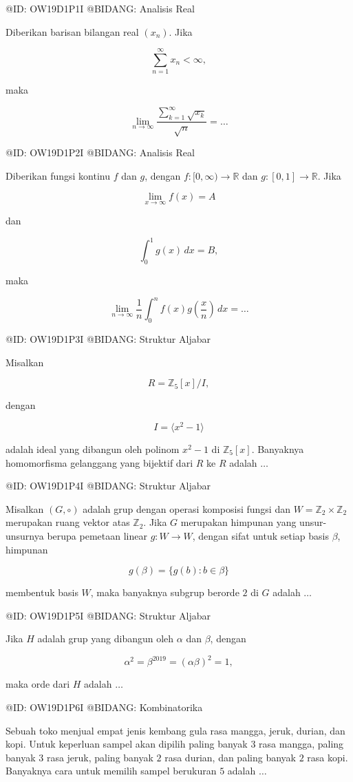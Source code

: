 @ID: OW19D1P1I
@BIDANG: Analisis Real

Diberikan barisan bilangan real $(x_n)$. Jika

$$
\sum_{n=1}^{\infty}x_n<\infty,
$$

maka

$$
\lim_{n\to\infty}\frac{\sum_{k=1}^{\infty}\sqrt{x_k}}{\sqrt n}=\ldots
$$

@ID: OW19D1P2I
@BIDANG: Analisis Real

Diberikan fungsi kontinu $f$ dan $g$, dengan $f:[0,\infty)\to\mathbb R$ dan $g:[0,1]\to\mathbb R$. Jika

$$
\lim_{x\to\infty}f(x)=A
$$

dan

$$
\int_0^1g(x)\,dx=B,
$$

maka

$$
\lim_{n\to\infty}\frac1n\int_0^n f(x)g\!\left(\frac xn\right)\,dx=\ldots
$$

@ID: OW19D1P3I
@BIDANG: Struktur Aljabar

Misalkan

$$
R=\mathbb Z_5[x]/I,
$$

dengan

$$
I=\langle x^2-1\rangle
$$

adalah ideal yang dibangun oleh polinom $x^2-1$ di $\mathbb Z_5[x]$. Banyaknya homomorfisma gelanggang yang bijektif dari $R$ ke $R$ adalah $\ldots$

@ID: OW19D1P4I
@BIDANG: Struktur Aljabar

Misalkan $(G,\circ)$ adalah grup dengan operasi komposisi fungsi dan $W=\mathbb Z_2\times\mathbb Z_2$ merupakan ruang vektor atas $\mathbb Z_2$. Jika $G$ merupakan himpunan yang unsur-unsurnya berupa pemetaan linear $g:W\to W$, dengan sifat untuk setiap basis $\beta$, himpunan

$$
g(\beta)=\{g(b):b\in\beta\}
$$

membentuk basis $W$, maka banyaknya subgrup berorde $2$ di $G$ adalah $\ldots$

@ID: OW19D1P5I
@BIDANG: Struktur Aljabar

Jika $H$ adalah grup yang dibangun oleh $\alpha$ dan $\beta$, dengan

$$
\alpha^2=\beta^{2019}=(\alpha\beta)^2=1,
$$

maka orde dari $H$ adalah $\ldots$

@ID: OW19D1P6I
@BIDANG: Kombinatorika

Sebuah toko menjual empat jenis kembang gula rasa mangga, jeruk, durian, dan kopi. Untuk keperluan sampel akan dipilih paling banyak $3$ rasa mangga, paling banyak $3$ rasa jeruk, paling banyak $2$ rasa durian, dan paling banyak $2$ rasa kopi. Banyaknya cara untuk memilih sampel berukuran $5$ adalah $\ldots$

